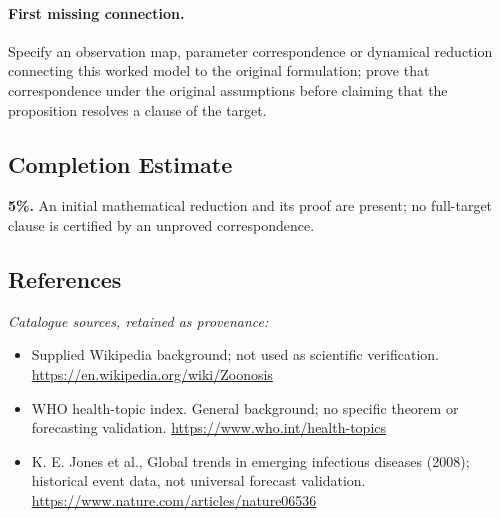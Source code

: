 \documentclass[11pt]{article}
\begin{document}
\paragraph{First missing connection.} Specify an observation map, parameter correspondence or dynamical reduction connecting this worked model to the original formulation; prove that correspondence under the original assumptions before claiming that the proposition resolves a clause of the target.
\subsection{Completion Estimate}
\textbf{5\%.} An initial mathematical reduction and its proof are present; no full-target clause is certified by an unproved correspondence.
\subsection{References}
\noindent\emph{Catalogue sources, retained as provenance:}
\begin{itemize}
\item Supplied Wikipedia background; not used as scientific verification. \url{https://en.wikipedia.org/wiki/Zoonosis}
\item WHO health-topic index. General background; no specific theorem or forecasting validation. \url{https://www.who.int/health-topics}
\item K. E. Jones et al., Global trends in emerging infectious diseases (2008); historical event data, not universal forecast validation. \url{https://www.nature.com/articles/nature06536}
\end{itemize}
\clearpage


\appendix
\end{document}
